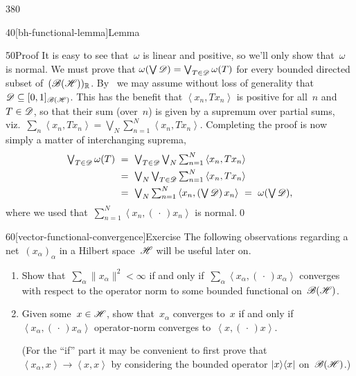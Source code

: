 \begin{parsec}{380}
\begin{point}{40}[bh-functional-lemma]{Lemma}
\begin{point}{50}{Proof}
It is easy to see that~$\omega$ is linear and positive,
so we'll only show that~$\omega$ is normal.
We must prove that $\omega(\bigvee \mathscr{D})=\bigvee_{T\in\mathscr{D}} \omega(T)$
for every bounded directed subset of~$(\mathscr{B}(\mathscr{H}))_{\mathbb{R}}$.
By~
we may assume without loss of generality that 
$\mathscr{D}\subseteq [0,1]_{\mathscr{B}(\mathscr{H})}$.
This has the benefit that $\left<x_n,T x_n\right>$
is positive for all~$n$ and~$T\in\mathscr{D}$,
so that their sum (over~$n$) is given by
a supremum over partial sums, viz.~$\sum_n\left<x_n,Tx_n\right>
=\bigvee_N\sum_{n=1}^N\left<x_n,Tx_n\right>$.
Completing the proof is now simply a matter of
interchanging suprema,
\begin{alignat*}{3}
	\textstyle \bigvee_{T\in \scrD} \omega(T)
	\ &=\ 
	\textstyle\bigvee_{T\in \scrD} \bigvee_N \sum_{n=1}^N 
	\left<x_n,Tx_n\right>\\
	\ &=\ 
	\textstyle\bigvee_N \bigvee_{T\in \scrD}\sum_{n=1}^N 
	\left<x_n,Tx_n\right>\\
	\ &=\ 
	\textstyle\bigvee_N \sum_{n=1}^N \left<x_n,(\bigvee \scrD )\,x_n\right>
	\ =\ \textstyle\omega(\bigvee\scrD),
\end{alignat*}
where we used that~$\sum_{n=1}^N \left<x_n,(\,\cdot\,)x_n\right>$
is normal.\qed
\end{point}
\end{point}
\begin{point}{60}[vector-functional-convergence]{Exercise}%
The following observations
regarding
a net~$(x_\alpha)_\alpha$ in a Hilbert space~$\mathscr{H}$
will be useful later on.
\begin{enumerate}
\item
Show that~$\sum_\alpha \|x_\alpha\|^2<\infty$
if and only if~$\sum_\alpha \left<x_\alpha,(\,\cdot\,)x_\alpha\right>$
converges with respect to the operator norm
to some bounded functional on~$\mathscr{B}(\mathscr{H})$.
\item
Given some~$x\in \mathscr{H}$,
show that~$x_\alpha$ converges to~$x$
if and only if  $\left<x_\alpha,(\,\cdot\,)x_\alpha\right>$
operator-norm converges to~$\left<x,(\,\cdot\,)x\right>$.

(For the ``if'' part it may be convenient
to first prove that $\left<x_\alpha,x\right>\to \left<x,x\right>$
by considering the bounded operator
$\left|x\right>\!\left<x\right|$ on~$\mathscr{B}(\mathscr{H})$.)
\end{enumerate}
\spacingfix
\end{point}%
\end{parsec}%
